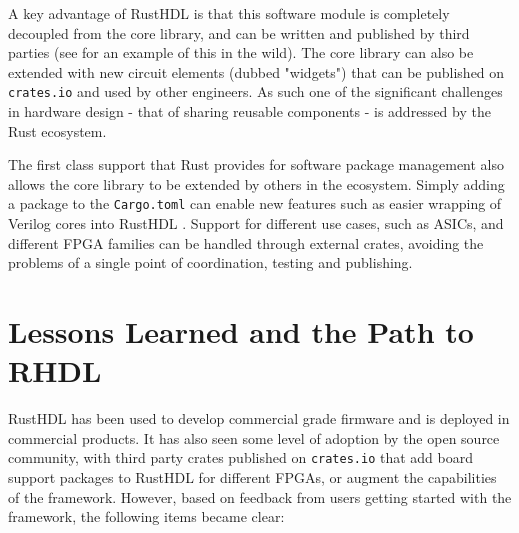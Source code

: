 \documentclass[conference]{IEEEtran}
\begin{document}
A key advantage of RustHDL is that this software module is completely decoupled
from the core library, and can be written and published by third parties (see \cite{b7} for an example of this in the wild).  
The core library can also be extended with new circuit elements (dubbed "widgets") that can be published on 
\verb|crates.io| and used by other engineers. As such one of the significant challenges in hardware design - 
that of sharing reusable components - is addressed by the Rust ecosystem.

The first class support that Rust provides for software package management also allows the core library to be extended
by others in the ecosystem.  Simply adding a package to the \verb|Cargo.toml| can enable new features such as 
easier wrapping of Verilog cores into RustHDL \cite{b8}.  Support for different use cases, such as ASICs, and different
FPGA families can be handled through external crates, avoiding the problems of a single point of coordination, testing
and publishing.

\section{Lessons Learned and the Path to RHDL}\label{sec:future}

RustHDL has been used to develop commercial grade firmware and is deployed in commercial products.  It has also seen 
some level of adoption by the open source community, with third party crates published on \verb|crates.io| that add board
support packages to RustHDL for different FPGAs, or augment the capabilities of the framework.  However, based on
feedback from users getting started with the framework, the following items became clear:
\end{document}
